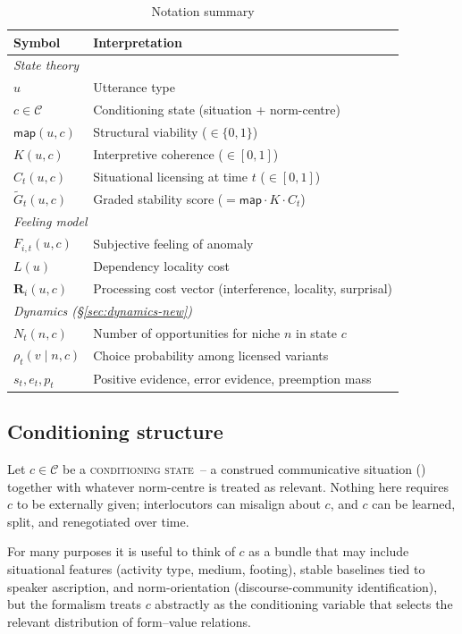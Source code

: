 \documentclass[12pt,letterpaper]{article}
\newcommand{\term}[1]{\textsc{#1}}
\begin{document}
\begin{table}[H]
\centering
\caption{Notation summary}
\label{tab:vars2}
\begin{tabular}{@{}p{3.5cm}l@{}}
\toprule
Symbol & Interpretation\\
\midrule
\multicolumn{2}{l}{\textit{State theory}}\\
$u$ & Utterance type\\
$c \in \mathcal{C}$ & Conditioning state (situation + norm-centre)\\
$\mathsf{map}(u,c)$ & Structural viability ($\in\{0,1\}$)\\
$K(u,c)$ & Interpretive coherence ($\in[0,1]$)\\
$C_t(u,c)$ & Situational licensing at time $t$ ($\in[0,1]$)\\
$\widetilde{G}_t(u,c)$ & Graded stability score ($=\mathsf{map}\cdot K \cdot C_t$)\\[3pt]
\multicolumn{2}{l}{\textit{Feeling model}}\\
$F_{i,t}(u,c)$ & Subjective feeling of anomaly\\
$L(u)$ & Dependency locality cost\\
$\mathbf{R}_i(u,c)$ & Processing cost vector (interference, locality, surprisal)\\[3pt]
\multicolumn{2}{l}{\textit{Dynamics (\S\ref{sec:dynamics-new})}}\\
$N_t(n,c)$ & Number of opportunities for niche $n$ in state $c$\\
$\rho_t(v\mid n,c)$ & Choice probability among licensed variants\\
$s_t, e_t, p_t$ & Positive evidence, error evidence, preemption mass\\
\bottomrule
\end{tabular}
\end{table}

\subsection{Conditioning structure}
\label{sec:conditioning}

Let $c\in\mathcal{C}$ be a \term{conditioning state}~-- a construed communicative situation
(\textcite{wiese2023}) together with whatever norm-centre is treated as relevant.
Nothing here requires $c$ to be externally given; interlocutors can misalign about $c$,
and $c$ can be learned, split, and renegotiated over time.

For many purposes it is useful to think of $c$ as a bundle that may include
situational features (activity type, medium, footing), stable baselines tied to
speaker ascription, and norm-orientation (discourse-community identification),
but the formalism treats $c$ abstractly as the conditioning variable that selects
the relevant distribution of form--value relations.
\end{document}

